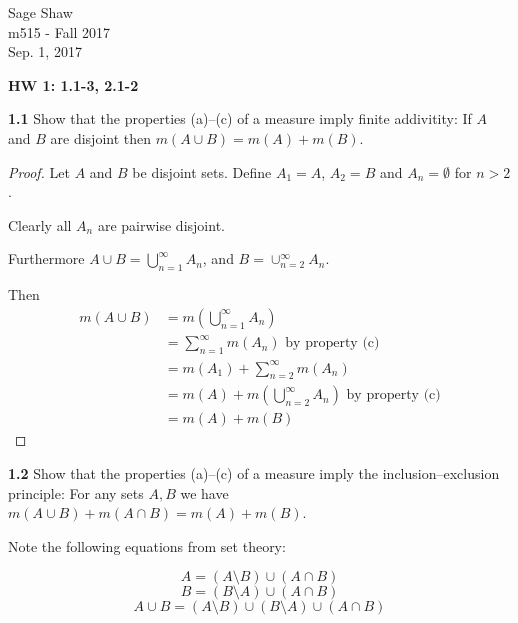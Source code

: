 \documentclass[12pt]{article}
\begin{document}
	\thispagestyle{empty}
	
	\begin{flushright}
		Sage Shaw \\
		m515 - Fall 2017 \\
		Sep. 1, 2017
	\end{flushright}
	
	{\large \textbf{HW 1: 1.1-3, 2.1-2}}\bigbreak

	\hspace{-4 ex}\textbf{1.1} Show that the properties (a)--(c) of a measure imply finite addivitity: If $A$ and $B$ are disjoint then $m(A\cup B)=m(A)+m(B)$.
	
	
	\begin{proof}
		 Let $A$ and $B$ be disjoint sets. Define $A_{1}=A$, $A_{2}=B$ and $A_{n}=\emptyset$ for $n>2$.
	
	Clearly all $A_{n}$ are pairwise disjoint.
	
	Furthermore $A \cup B = \bigcup_{n=1}^{\infty}A_{n}$, and $B = \cup_{n=2}^{\infty}A_{n}$.
	
	Then
	\begin{equation*}
	\begin{split}
	m(A \cup B) & = m(\bigcup\limits_{n=1}^{\infty}A_{n}) \\
	& = \sum_{n=1}^{\infty}m(A_{n}) \text{ by property (c)} \\
	& = m(A_{1}) + \sum_{n=2}^{\infty}m(A_{n}) \\
	& = m(A) + m(\bigcup\limits_{n=2}^{\infty}A_{n}) \text{ by property (c)} \\
	& = m(A) + m(B)
	\end{split}
	\end{equation*}
	
	\end{proof}

\bigbreak
\bigbreak



	\hspace{-4 ex}\textbf{1.2} Show that the properties (a)--(c) of a measure imply the inclusion--exclusion principle: For any sets $A,B$ we have $m(A\cup B)+m(A\cap B)=m(A)+m(B)$.
	
	Note the following equations from set theory:
	
	\begin{equation}
	A = (A \setminus B) \cup (A \cap B)
	\end{equation}
	\begin{equation}
	B = (B \setminus A) \cup (A \cap B)
	\end{equation}
	\begin{equation}
	A \cup B = (A \setminus B) \cup (B \setminus A) \cup (A \cap B)
	\end{equation}
	
\end{document}
